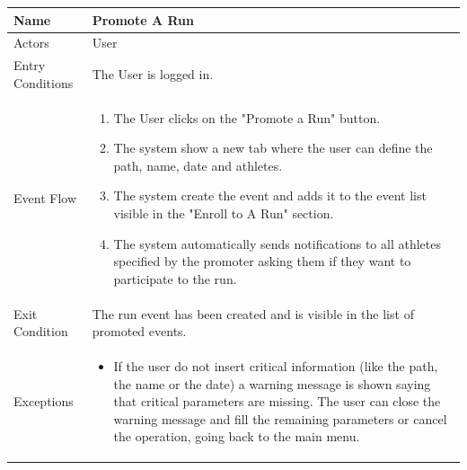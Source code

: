 \begin{enumerate}
\FloatBarrier
\begin{table}[h]
\begin{tabular}{|l|p{}|}
\hline
Name             & Promote A Run \\ \hline
Actors           & User  \\ \hline
Entry Conditions & The User is logged in.    \\ \hline
Event Flow       & \begin{enumerate}
            \item The User clicks on the "Promote a Run" button.
            \item The system show a new tab where the user can define the path, name, date and athletes.
            \item The system create the event and adds it to the event list visible in the "Enroll to A Run" section.
            \item The system automatically sends notifications to all athletes specified by the promoter asking them if they want to participate to the run.
        \end{enumerate}\\ \hline
Exit Condition   & The run event has been created and is visible in the list of promoted events.\\ \hline
Exceptions       & \begin{itemize}
\item If the user do not insert critical information (like the path, the name or the date) a warning message is shown saying that critical parameters are missing. The user can close the warning message and fill the remaining parameters or cancel the operation, going back to the main menu.
\end{itemize}\\ \hline
\end{tabular}
\end{table}
\FloatBarrier


\end{enumerate}
